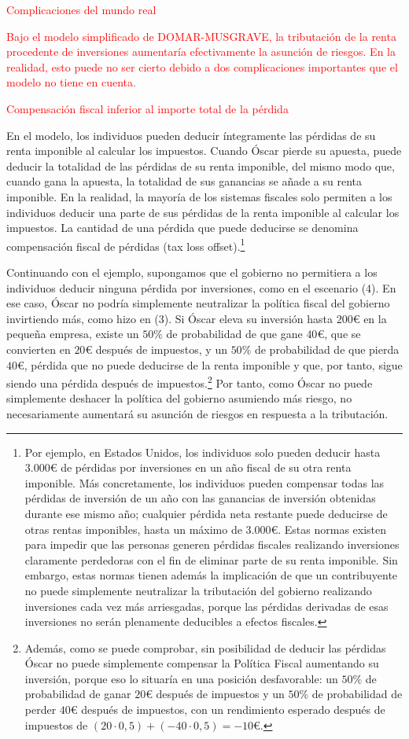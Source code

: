 \documentclass[10pt,a4paper]{article}
\begin{document}
\textcolor{red}{Complicaciones del mundo real

Bajo el modelo simplificado de DOMAR-MUSGRAVE, la tributación de la renta procedente de inversiones aumentaría efectivamente la asunción de riesgos. En la realidad, esto puede no ser cierto debido a dos complicaciones importantes que el modelo no tiene en cuenta.

Compensación fiscal inferior al importe total de la pérdida}

En el modelo, los individuos pueden deducir íntegramente las pérdidas de su renta imponible al calcular los impuestos. Cuando Óscar pierde su apuesta, puede deducir la totalidad de las pérdidas de su renta imponible, del mismo modo que, cuando gana la apuesta, la totalidad de sus ganancias se añade a su renta imponible. En la realidad, la mayoría de los sistemas fiscales solo permiten a los individuos deducir una parte de sus pérdidas de la renta imponible al calcular los impuestos. La cantidad de una pérdida que puede deducirse se denomina compensación fiscal de pérdidas (tax loss offset).\footnote{%
    Por ejemplo, en Estados Unidos, los individuos solo pueden deducir hasta $3.000€$ de pérdidas por inversiones en un año fiscal de su otra renta imponible. Más concretamente, los individuos pueden compensar todas las pérdidas de inversión de un año con las ganancias de inversión obtenidas durante ese mismo año; cualquier pérdida neta restante puede deducirse de otras rentas imponibles, hasta un máximo de $3.000€$. Estas normas existen para impedir que las personas generen pérdidas fiscales realizando inversiones claramente perdedoras con el fin de eliminar parte de su renta imponible. Sin embargo, estas normas tienen además la implicación de que un contribuyente no puede simplemente neutralizar la tributación del gobierno realizando inversiones cada vez más arriesgadas, porque las pérdidas derivadas de esas inversiones no serán plenamente deducibles a efectos fiscales.
}

Continuando con el ejemplo, supongamos que el gobierno no permitiera a los individuos deducir ninguna pérdida por inversiones, como en el escenario (4). En ese caso, Óscar no podría simplemente neutralizar la política fiscal del gobierno invirtiendo más, como hizo en (3). Si Óscar eleva su inversión hasta $200€$ en la pequeña empresa, existe un $50\%$ de probabilidad de que gane $40€$, que se convierten en $20€$ después de impuestos, y un $50\%$ de probabilidad de que pierda $40€$, pérdida que no puede deducirse de la renta imponible y que, por tanto, sigue siendo una pérdida después de impuestos.\footnote{%
    Además, como se puede comprobar, sin posibilidad de deducir las pérdidas Óscar no puede simplemente compensar la Política Fiscal aumentando su inversión, porque eso lo situaría en una posición desfavorable: un $50\%$ de probabilidad de ganar $20€$ después de impuestos y un $50\%$ de probabilidad de perder $40€$ después de impuestos, con un rendimiento esperado después de impuestos de $(20\cdot  0,5) + (−40\cdot 0,5) = −10€$.
} Por tanto, como Óscar no puede simplemente deshacer la política del gobierno asumiendo más riesgo, no necesariamente aumentará su asunción de riesgos en respuesta a la tributación. 
\end{document}
